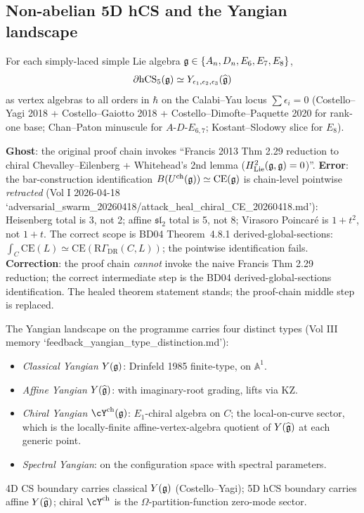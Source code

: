 \subsection{Non-abelian 5D hCS and the Yangian landscape}
\label{wn:subsec:healed-nonab-hCS-Yangian}

\begin{theorem}\ClaimStatusHealed
\label{wn:thm:healed-nonab-compound}
For each simply-laced simple Lie algebra $\mathfrak{g} \in \{A_n, D_n, E_6, E_7, E_8\}$,
\[
\partial \mathrm{hCS}_5(\mathfrak{g}) \simeq Y_{\epsilon_1, \epsilon_2, \epsilon_3}(\widehat{\mathfrak{g}})
\]
as vertex algebras to all orders in $\hbar$ on the Calabi--Yau locus $\sum \epsilon_i = 0$ (Costello--Yagi 2018 + Costello--Gaiotto 2018 + Costello--Dimofte--Paquette 2020 for rank-one base; Chan--Paton minuscule for $A$-$D$-$E_{6, 7}$; Kostant--Slodowy slice for $E_8$).
\end{theorem}

\textbf{Ghost}: the original proof chain invokes ``Francis 2013 Thm 2.29 reduction to chiral Chevalley--Eilenberg + Whitehead's 2nd lemma ($H^2_{\mathrm{Lie}}(\mathfrak{g}, \mathfrak{g}) = 0$)''. \textbf{Error}: the bar-construction identification $B(U^{\mathrm{ch}}(\mathfrak{g})) \simeq \mathrm{CE}(\mathfrak{g})$ is chain-level pointwise \emph{retracted} (Vol I 2026-04-18 `adversarial\_swarm\_20260418/attack\_heal\_chiral\_CE\_20260418.md'): Heisenberg total is 3, not 2; affine $\mathfrak{sl}_2$ total is 5, not 8; Virasoro Poincaré is $1 + t^2$, not $1 + t$. The correct scope is BD04 Theorem~4.8.1 derived-global-sections: $\int_C \mathrm{CE}(L) \simeq \mathrm{CE}(\mathrm R\Gamma_{\mathrm{DR}}(C, L))$; the pointwise identification fails. \textbf{Correction}: the proof chain \emph{cannot} invoke the naive Francis Thm 2.29 reduction; the correct intermediate step is the BD04 derived-global-sections identification. The healed theorem statement stands; the proof-chain middle step is replaced.

\begin{remark}\ClaimStatusHealed
\label{wn:rmk:healed-chiral-yangian}
The Yangian landscape on the programme carries four distinct types (Vol III memory `feedback\_yangian\_type\_distinction.md'):
\begin{itemize}
\item \emph{Classical Yangian} $Y(\mathfrak{g})$: Drinfeld 1985 finite-type, on $\mathbb A^1$.
\item \emph{Affine Yangian} $Y(\widehat{\mathfrak{g}})$: with imaginary-root grading, lifts via KZ.
\item \emph{Chiral Yangian} $\cY^{\mathrm{ch}}(\fg)$: $E_1$-chiral algebra on $C$; the local-on-curve sector, which is the locally-finite affine-vertex-algebra quotient of $Y(\widehat{\mathfrak{g}})$ at each generic point.
\item \emph{Spectral Yangian}: on the configuration space with spectral parameters.
\end{itemize}
4D CS boundary carries classical $Y(\mathfrak{g})$ (Costello--Yagi); 5D hCS boundary carries affine $Y(\widehat{\mathfrak{g}})$; chiral $\cY^{\mathrm{ch}}$ is the $\Omega$-partition-function zero-mode sector.
\end{remark}

